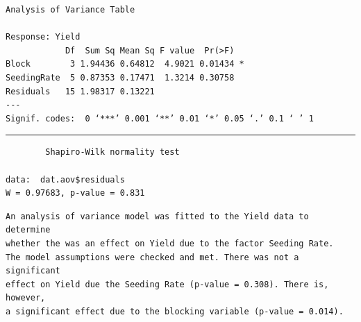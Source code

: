 \documentclass[a4paper, 10pt, fleqn, twosided]{memoir}
\begin{document}
\begin{tcolorbox}[title = Exercise 4 output continued]
\begin{verbatim}
Analysis of Variance Table

Response: Yield
            Df  Sum Sq Mean Sq F value  Pr(>F)
Block        3 1.94436 0.64812  4.9021 0.01434 *
SeedingRate  5 0.87353 0.17471  1.3214 0.30758
Residuals   15 1.98317 0.13221
---
Signif. codes:  0 ‘***’ 0.001 ‘**’ 0.01 ‘*’ 0.05 ‘.’ 0.1 ‘ ’ 1

\end{verbatim}
{\color{outpt} {\hrule height 1pt}}
\begin{verbatim}
        Shapiro-Wilk normality test

data:  dat.aov$residuals
W = 0.97683, p-value = 0.831

\end{verbatim}

\end{tcolorbox}


\begin{tcolorbox}[title = Exercise 4 interpretation]
\begin{verbatim}
An analysis of variance model was fitted to the Yield data to determine
whether the was an effect on Yield due to the factor Seeding Rate.
The model assumptions were checked and met. There was not a significant
effect on Yield due the Seeding Rate (p-value = 0.308). There is, however,
a significant effect due to the blocking variable (p-value = 0.014).
\end{verbatim}
\end{tcolorbox}

\clearpage


\end{document}
